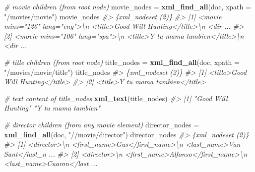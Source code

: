 \documentclass[
]{book}
\newenvironment{Shaded}{\begin{snugshade}}{\end{snugshade}}
\newcommand{\AttributeTok}[1]{\textcolor[rgb]{0.13,0.29,0.53}{#1}}
\newcommand{\CommentTok}[1]{\textcolor[rgb]{0.56,0.35,0.01}{\textit{#1}}}
\newcommand{\FunctionTok}[1]{\textcolor[rgb]{0.13,0.29,0.53}{\textbf{#1}}}
\newcommand{\NormalTok}[1]{#1}
\newcommand{\OtherTok}[1]{\textcolor[rgb]{0.56,0.35,0.01}{#1}}
\newcommand{\StringTok}[1]{\textcolor[rgb]{0.31,0.60,0.02}{#1}}
\begin{document}
\begin{Shaded}
\begin{Highlighting}[]
\CommentTok{\# movie children (from root node)}
\NormalTok{movie\_nodes }\OtherTok{=} \FunctionTok{xml\_find\_all}\NormalTok{(doc, }\AttributeTok{xpath =} \StringTok{"/movies/movie"}\NormalTok{)}
\NormalTok{movie\_nodes}
\CommentTok{\#\textgreater{} \{xml\_nodeset (2)\}}
\CommentTok{\#\textgreater{} [1] \textless{}movie mins="126" lang="eng"\textgreater{}\textbackslash{}n  \textless{}title\textgreater{}Good Will Hunting\textless{}/title\textgreater{}\textbackslash{}n  \textless{}dir ...}
\CommentTok{\#\textgreater{} [2] \textless{}movie mins="106" lang="spa"\textgreater{}\textbackslash{}n  \textless{}title\textgreater{}Y tu mama tambien\textless{}/title\textgreater{}\textbackslash{}n  \textless{}dir ...}
\end{Highlighting}
\end{Shaded}

\begin{Shaded}
\begin{Highlighting}[]
\CommentTok{\# title children (from root node)}
\NormalTok{title\_nodes }\OtherTok{=} \FunctionTok{xml\_find\_all}\NormalTok{(doc, }\AttributeTok{xpath =} \StringTok{"/movies/movie/title"}\NormalTok{)}
\NormalTok{title\_nodes}
\CommentTok{\#\textgreater{} \{xml\_nodeset (2)\}}
\CommentTok{\#\textgreater{} [1] \textless{}title\textgreater{}Good Will Hunting\textless{}/title\textgreater{}}
\CommentTok{\#\textgreater{} [2] \textless{}title\textgreater{}Y tu mama tambien\textless{}/title\textgreater{}}
\end{Highlighting}
\end{Shaded}

\begin{Shaded}
\begin{Highlighting}[]
\CommentTok{\# text content of title\_nodes}
\FunctionTok{xml\_text}\NormalTok{(title\_nodes)}
\CommentTok{\#\textgreater{} [1] "Good Will Hunting" "Y tu mama tambien"}
\end{Highlighting}
\end{Shaded}

\begin{Shaded}
\begin{Highlighting}[]
\CommentTok{\# director children (from any movie element)}
\NormalTok{director\_nodes }\OtherTok{=} \FunctionTok{xml\_find\_all}\NormalTok{(doc, }\StringTok{"//movie/director"}\NormalTok{)}
\NormalTok{director\_nodes}
\CommentTok{\#\textgreater{} \{xml\_nodeset (2)\}}
\CommentTok{\#\textgreater{} [1] \textless{}director\textgreater{}\textbackslash{}n  \textless{}first\_name\textgreater{}Gus\textless{}/first\_name\textgreater{}\textbackslash{}n  \textless{}last\_name\textgreater{}Van Sant\textless{}/last\_n ...}
\CommentTok{\#\textgreater{} [2] \textless{}director\textgreater{}\textbackslash{}n  \textless{}first\_name\textgreater{}Alfonso\textless{}/first\_name\textgreater{}\textbackslash{}n  \textless{}last\_name\textgreater{}Cuaron\textless{}/last ...}
\end{Highlighting}
\end{Shaded}
\end{document}
